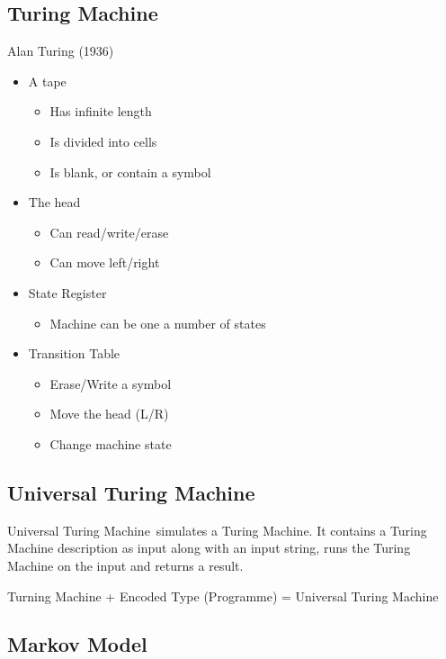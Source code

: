 \documentclass[a4paper, openany]{book}
\begin{document}
\subsection{Turing Machine}

Alan Turing (1936)

\begin{itemize}
  \item A tape
  \begin{itemize}
    \item Has infinite length
    \item Is divided into cells
    \item Is blank, or contain a symbol
  \end{itemize}
  \item The head
  \begin{itemize}
    \item Can read/write/erase
    \item Can move left/right
  \end{itemize}
  \item State Register
  \begin{itemize}
    \item Machine can be one a number of states
  \end{itemize}
  \item Transition Table
  \begin{itemize}
    \item Erase/Write a symbol
    \item Move the head (L/R)
    \item Change machine state
  \end{itemize}
\end{itemize}

\subsection{Universal Turing Machine}

Universal Turing Machine~simulates a Turing Machine. It contains a
Turing Machine description as input along with an input string, runs the
Turing Machine on the input and returns a result.

Turning Machine + Encoded Type (Programme) = Universal Turing Machine

\subsection{Markov Model}
\end{document}
